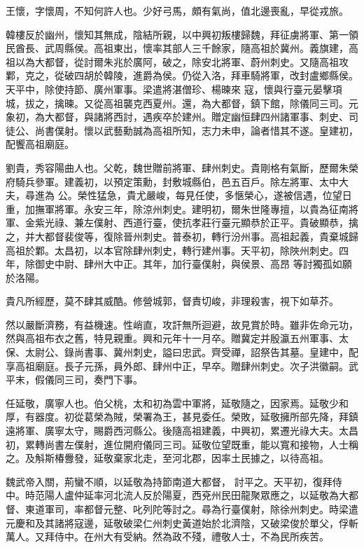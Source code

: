 \begin{pinyinscope}
 王懷，字懷周，不知何許人也。少好弓馬，頗有氣尚，值北邊喪亂，早從戎旅。



 韓樓反於幽州，懷知其無成，陰結所親，以中興初叛樓歸魏，拜征虜將軍、第一領民酋長、武周縣侯。高祖東出，懷率其部人三千餘家，隨高祖於冀州。義旗建，高祖以為大都督，從討爾朱兆於廣阿，破之，除安北將軍、蔚州刺史。又隨高祖攻鄴，克之，從破四胡於韓陵，進爵為侯。仍從入洛，拜車騎將軍，改封盧鄉縣侯。天平中，除使持節、廣州軍事。梁遣將湛僧珍、楊暕來
 寇，懷與行臺元晏擊項城，拔之，擒暕。又從高祖襲克西夏州。還，為大都督，鎮下館，除儀同三司。元象初，為大都督，與諸將西討，遇疾卒於建州。贈定幽恒肆四州諸軍事、刺史、司徒公、尚書僕射。懷以武藝勳誠為高祖所知，志力未申，論者惜其不遂。皇建初，配饗高祖廟庭。



 劉貴，秀容陽曲人也。父乾，魏世贈前將軍、肆州刺史。貴剛格有氣斷，歷爾朱榮府騎兵參軍。建義初，以預定策勳，封敷城縣伯，邑五百戶。除左將軍、太中大夫，尋進為
 公。榮性猛急，貴尤嚴峻，每見任使，多愜榮心，遂被信遇，位望日重，加撫軍將軍。永安三年，除涼州刺史。建明初，爾朱世隆專擅，以貴為征南將軍、金紫光祿、兼左僕射、西道行臺，使抗孝莊行臺元顯恭於正平。貴破顯恭，擒之，并大都督裴俊等，復除晉州刺史。普泰初，轉行汾州事。高祖起義，貴棄城歸高祖於鄴。太昌初，以本官除肆州刺史，轉行建州事。天平初，除陜州刺史。四年，除御史中尉、肆州大中正。其年，加行臺僕射，與侯景、高昂
 等討獨孤如願於洛陽。



 貴凡所經歷，莫不肆其威酷。修營城郭，督責切峻，非理殺害，視下如草芥。



 然以嚴斷濟務，有益機速。性峭直，攻訐無所迴避，故見賞於時。雖非佐命元功，然與高祖布衣之舊，特見親重。興和元年十一月卒。贈冀定并殷瀛五州軍事、太保、太尉公、錄尚書事、冀州刺史，謚曰忠武。齊受禪，詔祭告其墓。皇建中，配享高祖廟庭。長子元孫，員外郎、肆州中正，早卒。贈肆州刺史。次子洪徽嗣。武平末，假儀同三司，奏門下事。



 任延敬，廣寧人也。伯父桃，太和初為雲中軍將，延敬隨之，因家焉。延敬少和厚，有器度。初從葛榮為賊，榮署為王，甚見委任。榮敗，延敬擁所部先降，拜鎮遠將軍、廣寧太守，賜爵西河縣公。後隨高祖建義，中興初，累遷光祿大夫。太昌初，累轉尚書左僕射，進位開府儀同三司。延敬位望既重，能以寬和接物，人士稱之。及斛斯椿釁發，延敬棄家北走，至河北郡，因率土民據之，以待高祖。



 魏武帝入關，荊蠻不順，以延敬為持節南道大都督，
 討平之。天平初，復拜侍中。時范陽人盧仲延率河北流人反於陽夏，西兗州民田龍聚眾應之，以延敬為大都督、東道軍司，率都督元整、叱列陀等討之。尋為行臺僕射，除徐州刺史。時梁遣元慶和及其諸將寇邊，延敬破梁仁州刺史黃道始於北濟陰，又破梁俊於單父，俘斬萬人。又拜侍中。在州大有受納。然為政不殘，禮敬人士，不為民所疾苦。




\end{pinyinscope}
